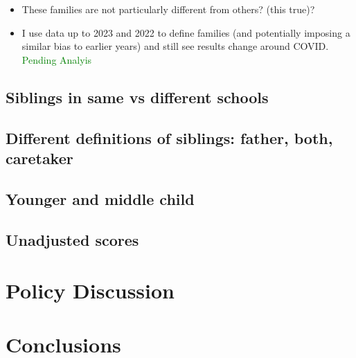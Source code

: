 \begin{itemize}
    \item These families are not particularly different from others? (this true)?
    \item I use data up to 2023 and 2022 to define families (and potentially imposing a similar bias to earlier years) and still see results change around COVID. \textcolor{green}{Pending Analyis}
\end{itemize}


\subsection{Siblings in same vs different schools}

\subsection{Different definitions of siblings: father, both, caretaker}

\subsection{Younger and middle child}

\subsection{Unadjusted scores}

\section{Policy Discussion}\label{sec:policy}

\section{Conclusions}\label{sec:conclusions}






